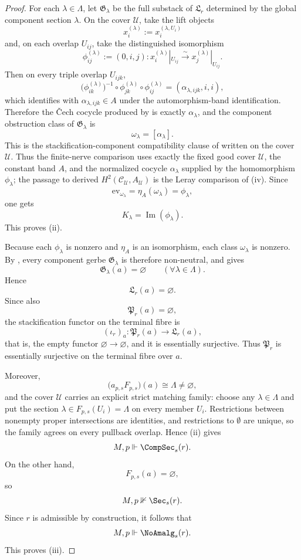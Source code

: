 \begin{proof}
For each $\lambda\in\Lambda$, let $\mathfrak G_\lambda$ be the full substack of $\mathfrak L_r$ determined by the global component section $\lambda$. On the cover $\mathcal U$, take the lift objects
\[
x_i^{(\lambda)}:=x_i^{(\lambda,U_i)}
\]
and, on each overlap $U_{ij}$, take the distinguished isomorphism
\[
\phi_{ij}^{(\lambda)}:=(0,i,j):x_i^{(\lambda)}|_{U_{ij}}\xrightarrow{\sim}x_j^{(\lambda)}|_{U_{ij}}.
\]
Then on every triple overlap $U_{ijk}$,
\[
\bigl(\phi_{ik}^{(\lambda)}\bigr)^{-1}\circ
\phi_{jk}^{(\lambda)}\circ
\phi_{ij}^{(\lambda)}
=
(\alpha_{\lambda,ijk},i,i),
\]
which identifies with $\alpha_{\lambda,ijk}\in A$ under the automorphism-band identification. Therefore the \v{C}ech cocycle produced by  is exactly $\alpha_\lambda$, and the component obstruction class of $\mathfrak G_\lambda$ is
\[
\omega_\lambda=[\alpha_\lambda].
\]
This is the stackification-component compatibility clause of  written on the cover $\mathcal U$.
Thus the finite-nerve comparison uses exactly the fixed good cover
$\mathcal U$, the constant band $A$, and the normalized cocycle
$\alpha_\lambda$ supplied by the homomorphism $\phi_\lambda$; the passage
to derived $H^2(\mathcal C_{\mathcal U},A_{\mathcal U})$ is the Leray comparison of
(iv).
Since
\[
\mathrm{ev}_{\omega_\lambda}=\eta_A(\omega_\lambda)=\phi_\lambda,
\]
one gets
\[
K_\lambda=\operatorname{Im}(\phi_\lambda).
\]
This proves \textup{(ii)}.

Because each $\phi_\lambda$ is nonzero and $\eta_A$ is an isomorphism, each class $\omega_\lambda$ is nonzero. By , every component gerbe $\mathfrak G_\lambda$ is therefore non-neutral, and  gives
\[
\mathfrak G_\lambda(a)=\varnothing
\qquad
(\forall \lambda\in\Lambda).
\]
Hence
\[
\mathfrak L_r(a)=\varnothing.
\]
Since also
\[
\mathfrak P_r(a)=\varnothing,
\]
the stackification functor on the terminal fibre is
\[
(\iota_r)_a:\mathfrak P_r(a)\to \mathfrak L_r(a),
\]
that is, the empty functor $\varnothing\to\varnothing$, and it is essentially surjective. Thus $\mathfrak P_r$ is essentially surjective on the terminal fibre over $a$.

Moreover,
\[
\bigl(a_{p,s}F_{p,s}\bigr)(a)\cong \Lambda\neq\varnothing,
\]
and the cover $\mathcal U$ carries an explicit strict matching family:
choose any $\lambda\in\Lambda$ and put the section $\lambda\in
F_{p,s}(U_i)=\Lambda$ on every member $U_i$. Restrictions between
nonempty proper intersections are identities, and restrictions to
$\emptyset$ are unique, so the family agrees on every pullback overlap.
Hence (ii) gives
\[
M,p\Vdash \CompSec_s(r).
\]
On the other hand,
\[
F_{p,s}(a)=\varnothing,
\]
so
\[
M,p\nVdash \Sec_s(r).
\]
Since $r$ is admissible by construction, it follows that
\[
M,p\Vdash \NoAmalg_s(r).
\]
This proves \textup{(iii)}.


\end{proof}
